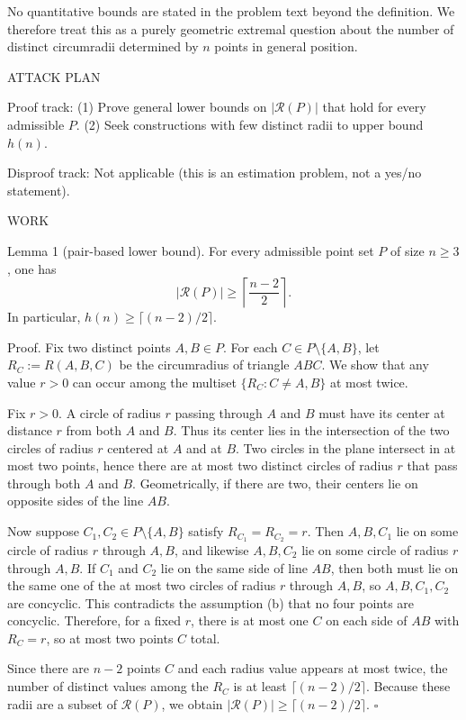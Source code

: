 No quantitative bounds are stated in the problem text beyond the definition.
We therefore treat this as a purely geometric extremal question about the number of distinct circumradii determined by $n$ points in general position.

ATTACK PLAN

Proof track:
(1) Prove general lower bounds on $|\mathcal{R}(P)|$ that hold for every admissible $P$.
(2) Seek constructions with few distinct radii to upper bound $h(n)$.

Disproof track:
Not applicable (this is an estimation problem, not a yes/no statement).

WORK

Lemma 1 (pair-based lower bound).
For every admissible point set $P$ of size $n\ge 3$, one has
\[
|\mathcal{R}(P)|\ge \left\lceil\frac{n-2}{2}\right\rceil.
\]
In particular, $h(n)\ge \lceil (n-2)/2\rceil$.

Proof.
Fix two distinct points $A,B\in P$.
For each $C\in P\setminus\{A,B\}$, let $R_C:=R(A,B,C)$ be the circumradius of triangle $ABC$.
We show that any value $r>0$ can occur among the multiset $\{R_C: C\ne A,B\}$ at most twice.

Fix $r>0$.
A circle of radius $r$ passing through $A$ and $B$ must have its center at distance $r$ from both $A$ and $B$.
Thus its center lies in the intersection of the two circles of radius $r$ centered at $A$ and at $B$.
Two circles in the plane intersect in at most two points, hence there are at most two distinct circles of radius $r$ that pass through both $A$ and $B$.
Geometrically, if there are two, their centers lie on opposite sides of the line $AB$.

Now suppose $C_1,C_2\in P\setminus\{A,B\}$ satisfy $R_{C_1}=R_{C_2}=r$.
Then $A,B,C_1$ lie on some circle of radius $r$ through $A,B$, and likewise $A,B,C_2$ lie on some circle of radius $r$ through $A,B$.
If $C_1$ and $C_2$ lie on the same side of line $AB$, then both must lie on the same one of the at most two circles of radius $r$ through $A,B$, so $A,B,C_1,C_2$ are concyclic.
This contradicts the assumption (b) that no four points are concyclic.
Therefore, for a fixed $r$, there is at most one $C$ on each side of $AB$ with $R_C=r$, so at most two points $C$ total.

Since there are $n-2$ points $C$ and each radius value appears at most twice, the number of distinct values among the $R_C$ is at least $\lceil (n-2)/2\rceil$.
Because these radii are a subset of $\mathcal{R}(P)$, we obtain $|\mathcal{R}(P)|\ge \lceil (n-2)/2\rceil$.
$\square$

